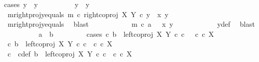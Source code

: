 \begin{isabellebody}
{\isacharparenleft}{\kern0pt}cases\ {\isachardoublequoteopen}y\ {\isacharequal}{\kern0pt}\ y{}{\isachardoublequoteclose}{\isacharparenright}{\kern0pt}\isanewline
\ \ \ \ \ \ \ \ \isamarkupfalse%
\ {\isachardoublequoteopen}y\ {\isacharequal}{\kern0pt}\ y{}{\isachardoublequoteclose}\isanewline
\ \ \ \ \ \ \ \ \isamarkupfalse%
\ \ \isamarkupfalse%
\ m{\isacharunderscore}{\kern0pt}rightproj{\isacharunderscore}{\kern0pt}y{\isacharunderscore}{\kern0pt}equals{\isacharcolon}{\kern0pt}\ {\isachardoublequoteopen}m\ {\isasymcirc}\isactrlsub c\ right{\isacharunderscore}{\kern0pt}coproj\ X\ Y\ {\isasymcirc}\isactrlsub c\ y\ {\isacharequal}{\kern0pt}\ {\isasymlangle}x{}{\isacharcomma}{\kern0pt}\ y{}{\isasymrangle}{\isachardoublequoteclose}\isanewline
\ \ \ \ \ \ \ \ \ \ \isamarkupfalse%
\ m{\isacharunderscore}{\kern0pt}rightproj{\isacharunderscore}{\kern0pt}y{}{\isacharunderscore}{\kern0pt}equals\ \isamarkupfalse%
\ blast\isanewline
\ \ \ \ \ \ \ \ \isamarkupfalse%
\ \isamarkupfalse%
\ {\isachardoublequoteopen}m\ {\isasymcirc}\isactrlsub c\ a\ \ {\isacharequal}{\kern0pt}\ {\isasymlangle}x{}{\isacharcomma}{\kern0pt}\ y{}{\isasymrangle}{\isachardoublequoteclose}\isanewline
\ \ \ \ \ \ \ \ \ \ \isamarkupfalse%
\ y{\isacharunderscore}{\kern0pt}def\ \isamarkupfalse%
\ blast\isanewline
\ \ \ \ \ \ \ \ \isamarkupfalse%
\ {\isachardoublequoteopen}a\ {\isacharequal}{\kern0pt}\ b{\isachardoublequoteclose}\isanewline
\ \ \ \ \ \ \ \ \isamarkupfalse%
{\isacharparenleft}{\kern0pt}cases\ {\isachardoublequoteopen}{\isasymexists}c{\isachardot}{\kern0pt}\ b\ {\isacharequal}{\kern0pt}\ left{\isacharunderscore}{\kern0pt}coproj\ X\ Y\ {\isasymcirc}\isactrlsub c\ c\ \ {\isasymand}\ c\ {\isasymin}\isactrlsub c\ X{\isachardoublequoteclose}{\isacharparenright}{\kern0pt}\isanewline
\ \ \ \ \ \ \ \ \ \ \isamarkupfalse%
\ {\isachardoublequoteopen}{\isasymexists}c{\isachardot}{\kern0pt}\ b\ {\isacharequal}{\kern0pt}\ left{\isacharunderscore}{\kern0pt}coproj\ X\ Y\ {\isasymcirc}\isactrlsub c\ c\ {\isasymand}\ c\ {\isasymin}\isactrlsub c\ X{\isachardoublequoteclose}\isanewline
\ \ \ \ \ \ \ \ \ \ \isamarkupfalse%
\ \isamarkupfalse%
\ c\ \ c{\isacharunderscore}{\kern0pt}def{\isacharcolon}{\kern0pt}\ {\isachardoublequoteopen}b\ {\isacharequal}{\kern0pt}\ left{\isacharunderscore}{\kern0pt}coproj\ X\ Y\ {\isasymcirc}\isactrlsub c\ c\ {\isasymand}\ c\ {\isasymin}\isactrlsub c\ X{\isachardoublequoteclose}\isanewline

\end{isabellebody}

